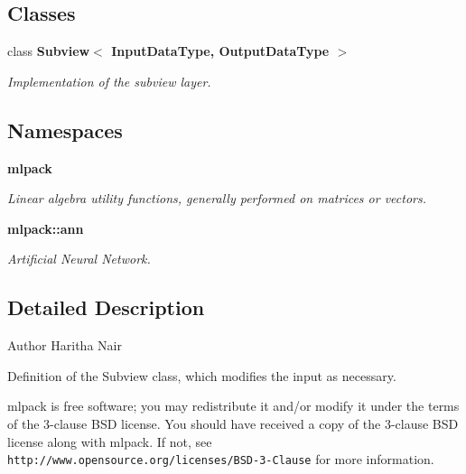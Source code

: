 \subsection*{Classes}
\begin{DoxyCompactItemize}
\item 
class \textbf{ Subview$<$ Input\+Data\+Type, Output\+Data\+Type $>$}
\begin{DoxyCompactList}\small\item\em Implementation of the subview layer. \end{DoxyCompactList}\end{DoxyCompactItemize}
\subsection*{Namespaces}
\begin{DoxyCompactItemize}
\item 
 \textbf{ mlpack}
\begin{DoxyCompactList}\small\item\em Linear algebra utility functions, generally performed on matrices or vectors. \end{DoxyCompactList}\item 
 \textbf{ mlpack\+::ann}
\begin{DoxyCompactList}\small\item\em Artificial Neural Network. \end{DoxyCompactList}\end{DoxyCompactItemize}


\subsection{Detailed Description}
\begin{DoxyAuthor}{Author}
Haritha Nair
\end{DoxyAuthor}
Definition of the Subview class, which modifies the input as necessary.

mlpack is free software; you may redistribute it and/or modify it under the terms of the 3-\/clause B\+SD license. You should have received a copy of the 3-\/clause B\+SD license along with mlpack. If not, see {\tt http\+://www.\+opensource.\+org/licenses/\+B\+S\+D-\/3-\/\+Clause} for more information. 